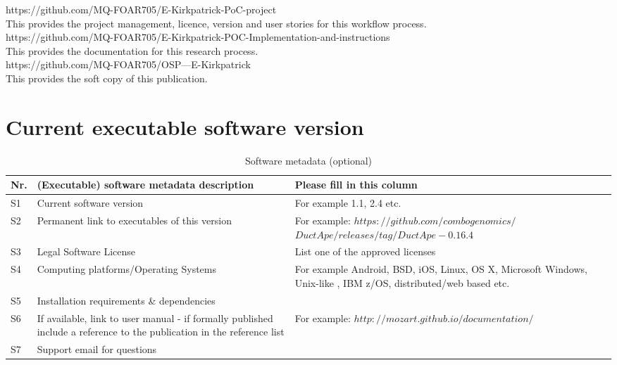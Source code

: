 \documentclass[preprint,12pt, a4paper]{elsarticle}
\begin{document}


\begin{thebibliography}{00}



\bibitem{}
https://github.com/MQ-FOAR705/E-Kirkpatrick-PoC-project\\
This provides the project management, licence, version and user stories for this workflow process.\\
\bibitem{}
https://github.com/MQ-FOAR705/E-Kirkpatrick-POC-Implementation-and-instructions\\
This provides the documentation for this research process.\\
\bibitem{}
https://github.com/MQ-FOAR705/OSP---E-Kirkpatrick\\
This provides the soft copy of this publication. 
\end{thebibliography}


\section*{Current executable software version}
\label{}

\begin{table}[!h]
\begin{tabular}{|l|p{6.5cm}|p{6.5cm}|}
\hline
\textbf{Nr.} & \textbf{(Executable) software metadata description} & \textbf{Please fill in this column} \\
\hline
S1 & Current software version & For example 1.1, 2.4 etc. \\
\hline
S2 & Permanent link to executables of this version  & For example: $https://github.com/combogenomics/$ $DuctApe/releases/tag/DuctApe-0.16.4$ \\
\hline
S3 & Legal Software License & List one of the approved licenses \\
\hline
S4 & Computing platforms/Operating Systems & For example Android, BSD, iOS, Linux, OS X, Microsoft Windows, Unix-like , IBM z/OS, distributed/web based etc. \\
\hline
S5 & Installation requirements \& dependencies & \\
\hline
S6 & If available, link to user manual - if formally published include a reference to the publication in the reference list & For example: $http://mozart.github.io/documentation/$ \\
\hline
S7 & Support email for questions & \\
\hline
\end{tabular}
\caption{Software metadata (optional)}
\label{} 
\end{table}
\end{document}
